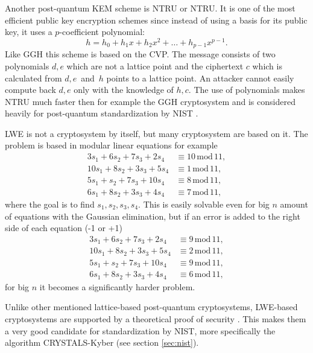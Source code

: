 Another post-quantum KEM scheme is NTRU or \acl{NTRU}. It is one of the most efficient public key encryption schemes since instead of using a basis for  its public key, it uses a $p$-coefficient polynomial:
\begin{equation}
  h=h_0+h_1x+h_2x^2+\dots+h_{p-1}x^{p-1}.
\end{equation}
Like GGH this scheme is based on the CVP. The message consists of two polynomials $d, e$ which are not a lattice point and the ciphertext $c$ which is calculated from $d, e$~and~$h$ points to a lattice point. An attacker cannot easily compute back $d, e$ only with the knowledge of $h, c$. The use of polynomials makes NTRU much faster then for example the GGH cryptosystem and is considered heavily for post-quantum standardization by NIST \cite{Bernstein149}.

LWE is not a cryptosystem by itself, but many cryptosystem are based on it. The problem is based in modular linear equations for example
\begin{align}
  3s_1+6s_2+7s_3+2s_4&\equiv 10\,\mathrm{mod}\,11,\\
  10s_1+8s_2+3s_3+5s_4&\equiv 1\,\mathrm{mod}\,11,\\
  5s_1+s_2+7s_3+10s_4&\equiv 8\,\mathrm{mod}\,11,\\
  6s_1+8s_2+3s_3+4s_4&\equiv 7\,\mathrm{mod}\,11,
\end{align}
where the goal is to find $s_1, s_2, s_3, s_4$. This is easily solvable even for big $n$ amount of equations with the Gaussian elimination, but if an error is added to the right side of each equation (-1 or +1)
\begin{align}
  3s_1+6s_2+7s_3+2s_4&\equiv 9\,\mathrm{mod}\,11,\\
  10s_1+8s_2+3s_3+5s_4&\equiv 2\,\mathrm{mod}\,11,\\
  5s_1+s_2+7s_3+10s_4&\equiv 9\,\mathrm{mod}\,11,\\
  6s_1+8s_2+3s_3+4s_4&\equiv 6\,\mathrm{mod}\,11,
\end{align}
for big $n$ it becomes a significantly harder problem. \cite{Regev2005}

Unlike other mentioned lattice-based post-quantum cryptosystems, LWE-based cryptosystems are supported by a theoretical proof of security \cite{Bernstein2009}. This makes them a very good candidate for standardization by NIST, more specifically the algorithm CRYSTALS-Kyber (see section \ref{sec:nist}).
